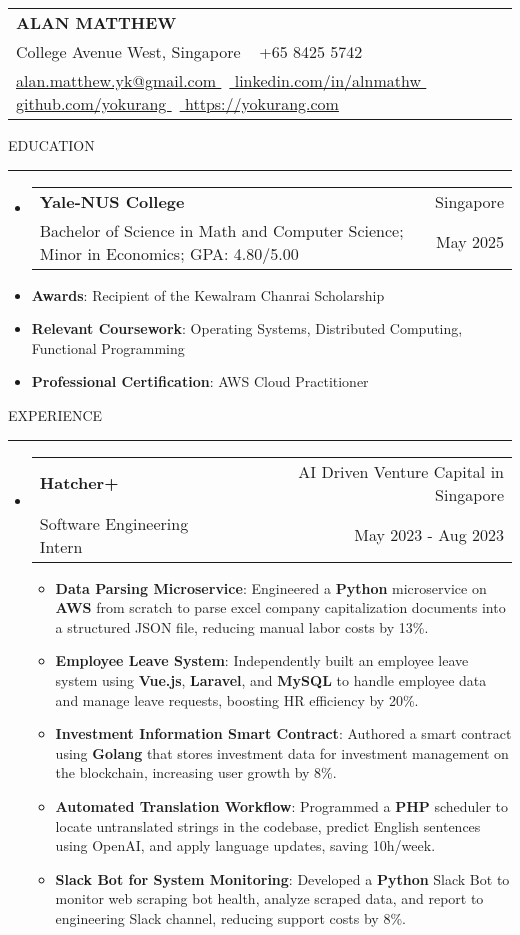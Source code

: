 \documentclass[letterpaper, 11pt]{article}
\makeatletter
\def\sectionlineskip{\medskip}
\def\sectionskip{\medskip}
\def\namesize{\LARGE}
\newcommand{\ResumeHeader}[6]{
  \noindent
  \begin{tabularx}{\textwidth}{>{\centering\arraybackslash}X}
    \namesize\MakeUppercase{\textbf{\fullname}} \\
    #1 \textbar\ #2 \\
    #3 \textbar\ #4 \textbar\ #5 \textbar\ #6 \\
  \end{tabularx}
}
\def \fullname { Alan Matthew }
\def \linkedinlink { https://www.linkedin.com/in/alnmathw }
\def \linkedintext { linkedin.com/in/alnmathw }
\def \phonenumber { +65 8425 5742 }
\def \githublink { https://github.com/yokurang }
\def \githubtext { github.com/yokurang }
\def \emaillink { mailto:alan.matthew.yk@gmail.com }
\def \emailtext { alan.matthew.yk@gmail.com }
\def \websitelink { https://yokurang.com }
\def \websitetext { https://yokurang.com }
\def \address { 28 College Avenue West, Singapore }
\def \headertype {\ResumeHeader}
\def \linkedin {\href{\linkedinlink}{\linkedintext}}
\def \phone {{\phonenumber}}
\def \email {\href{\emaillink}{\emailtext}}
\def \github {\href{\githublink}{\githubtext}}
\def \website {\href{\websitelink}{\websitetext}}
\newcommand{\SectionHeading}[1]{
  \sectionskip
  \raggedright\raggedbottom\MakeUppercase{\large{#1}}
  \sectionlineskip
  \hrule
  \color{black}
}
\newcommand{\ResumeEntryTSDL}[4]{
  \vspace{-1pt}\item
    \begin{tabular*}{\textwidth}[t]{l@{\extracolsep{\fill}}r} 
      \textbf{#1} & #2 \\
      #3 & #4 \\
    \end{tabular*}\vspace{-4pt}
}
\newcommand{\ResumeItem}[2]{
  \item{
    \textbf{#1}{: #2 \vspace{-2pt}}
  }
}
\newcommand{\ResumeSubItem}[2]{\ResumeItem{#1}{#2}\vspace{-4pt}}
\newcommand{\ResumeEntryStart}{\begin{itemize}[leftmargin=2mm, label={}]}
\newcommand{\ResumeEntryEnd}{\end{itemize}\vspace{-7pt}}
\newcommand{\ResumeItemListStart}{\begin{itemize}[leftmargin=5mm, label=$\bullet$]}
\newcommand{\ResumeItemListEnd}{\end{itemize}}
\makeatother
\begin{document}
  \headertype{\address}{\phone}{\email}{\linkedin}{\github}{\website}
  
  \SectionHeading{Education}
  \ResumeEntryStart
    \ResumeEntryTSDL{Yale-NUS College} {Singapore}
    {Bachelor of Science in Math and Computer Science; Minor in Economics; GPA: 4.80/5.00} {May 2025}
    \ResumeSubItem{Awards}{Recipient of the Kewalram Chanrai Scholarship}
    \ResumeSubItem{Relevant Coursework}{Operating Systems, Distributed Computing, Functional Programming}
    \ResumeSubItem{Professional Certification}{AWS Cloud Practitioner}
  \ResumeEntryEnd

  \vspace{5pt}

  \SectionHeading{Experience}
  \ResumeEntryStart
    \ResumeEntryTSDL{Hatcher+}{AI Driven Venture Capital in Singapore}{Software Engineering Intern}{May 2023 - Aug 2023}
    \ResumeItemListStart
      \ResumeItem{Data Parsing Microservice}
      {Engineered a \textbf{Python} microservice on \textbf{AWS} from scratch to parse excel company capitalization documents into a structured JSON file, reducing manual labor costs by 13\%.}

      \ResumeItem{Employee Leave System}
      {Independently built an employee leave system using \textbf{Vue.js}, \textbf{Laravel}, and \textbf{MySQL} to handle employee data and manage leave requests, boosting HR efficiency by 20\%.}

      \ResumeItem{Investment Information Smart Contract}
      {Authored a smart contract using \textbf{Golang} that stores investment data for investment management on the blockchain, increasing user growth by 8\%.}

      \ResumeItem{Automated Translation Workflow}
      {Programmed a \textbf{PHP} scheduler to locate untranslated strings in the codebase, predict English sentences using OpenAI, and apply language updates, saving 10h/week.}

      \ResumeItem{Slack Bot for System Monitoring}
      {Developed a \textbf{Python} Slack Bot to monitor web scraping bot health, analyze scraped data, and report to engineering Slack channel, reducing support costs by 8\%.}
    \ResumeItemListEnd
  \ResumeEntryEnd
\end{document}
